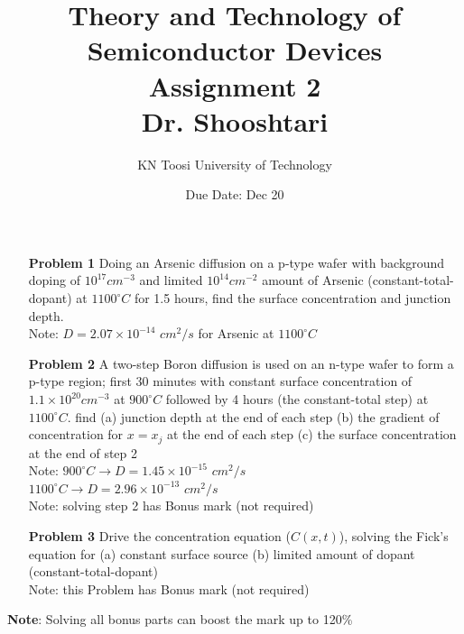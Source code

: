 \documentclass{report}
\title{Theory and Technology of Semiconductor Devices\\ Assignment 2 \\ \vspace{30pt} Dr. Shooshtari}
\author{KN Toosi University of Technology}
\date{Due Date: Dec 20}
\begin{document}
	\maketitle
	
	\begin{enumerate}
		\item[\bf{Problem 1}] Doing an Arsenic diffusion on a p-type wafer with background doping of $10^{17} cm^{-3}$ and limited $10^{14} cm^{-2}$ amount of Arsenic (constant-total-dopant) at $1100^{\circ} C$ for 1.5 hours, find the surface concentration and junction depth. \\
		Note: $D=2.07\times 10^{-14}$ $cm^2/s$ for Arsenic at $1100^{\circ} C$
		
		\item[\bf{Problem 2}] A two-step Boron diffusion is used on an n-type wafer to form a p-type region; first 30 minutes with constant surface concentration of $1.1\times 10^{20} cm^{-3}$ at $900^{\circ} C$ followed by 4 hours (the constant-total step) at $1100^{\circ} C$. find (a) junction depth at the end of each step (b) the gradient of concentration for $x=x_j$ at the end of each step (c) the surface concentration at the end of step 2\\
		Note: $900^{\circ} C \rightarrow D = 1.45\times 10^{-15}$ $cm^{2}/s$ \\
		$1100^{\circ} C \rightarrow D = 2.96\times 10^{-13}$ $cm^{2}/s$ \\
		Note: solving step 2 has Bonus mark (not required)
		
		\item[\bf{Problem 3}] Drive the concentration equation ($C(x,t)$), solving the Fick's equation for (a) constant surface source (b) limited amount of dopant (constant-total-dopant) \\
		Note: this Problem has Bonus mark (not required)
	\end{enumerate}
	\vspace{120pt}
	\hspace{-35pt} \textbf{Note}: Solving all bonus parts can boost the mark up to 120\% 
\end{document}
